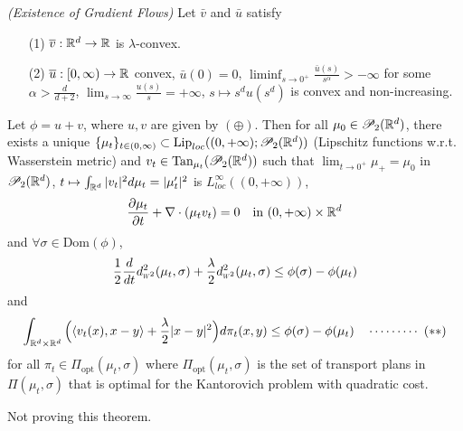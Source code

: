 \documentclass[12pt,a4paper]{article}
\newenvironment{proof}
{\begin{changemargin}{1cm}{0.5cm} 
	}%
	{\end{changemargin}
}
\begin{document}
 \emph{(Existence of Gradient Flows)} Let $\bar{v}$ and $\bar{u}$ satisfy
\begin{itemize}
\item[(1)] $\overline{v} :\mathbb{R}^d \rightarrow \mathbb{R}$ is $\lambda$-convex.
\item[(2)] $\overline{u} : [0, \infty) \rightarrow \mathbb{R}$ convex, $\bar{u}(0) =0$, $\liminf_{s\rightarrow 0^+} \frac{\bar{u}(s)}{s^{\alpha}}> -\infty$ for some $\alpha > \frac{d}{d+2}$, $\lim_{s\rightarrow \infty} \frac{u(s)}{s} = +\infty$, $s\mapsto s^d u(s^d)$ is convex and non-increasing.
\end{itemize}
Let $\phi = u+v$, where $u,v$ are given by $(\oplus)$. Then for all $\mu_0 \in \mathscr{P}_2(\mathbb{R}^d)$, there exists a unique $\{\mu_t\}_{t\in (0, \infty)} \subset \text{Lip}_{loc}((0, +\infty) ; \mathscr{P}_2(\mathbb{R}^d))$ (Lipschitz functions w.r.t. Wasserstein metric) and $v_t \in \text{Tan}_{\mu_t}(\mathscr{P}_2(\mathbb{R}^d))$ such that $\lim_{t\rightarrow 0^+} \mu_+ = \mu_0$ in $\mathscr{P}_2(\mathbb{R}^d)$, $t\mapsto \int_{\mathbb{R}^d} |v_t|^2 d\mu_t = |\mu_t'|^2$ is $L^{\infty}_{loc}((0, +\infty))$, 
\begin{align*}
\frac{\partial \mu_t}{\partial t} + \nabla \cdot (\mu_t v_t) =0 \quad \text{in }(0, +\infty) \times \mathbb{R}^d
\end{align*}
and $\forall \sigma\in \text{Dom}(\phi)$,
\begin{align*}
\frac{1}{2} \frac{d}{dt} \wa{2}^2(\mu_t, \sigma) + \frac{\lambda}{2} \wa{2}^2(\mu_t, \sigma) \leq \phi(\sigma) - \phi(\mu_t)
\end{align*}
and
\begin{align*}
\int_{\mathbb{R}^d \times \mathbb{R}^d} \Big( \langle v_t(x), x-y\rangle + \frac{\lambda}{2}|x-y|^2 \Big) d\pi_t(x,y) \leq \phi(\sigma) - \phi(\mu_t) \quad \cdots\cdots\cdots\,\,(**)
\end{align*}
for all $\pi_t \in \Pi_{\text{opt}}(\mu_t, \sigma)$ where $\Pi_{\text{opt}}(\mu_t, \sigma)$ is the set of transport plans in $\Pi(\mu_t, \sigma)$ that is optimal for the Kantorovich problem with quadratic cost.
\begin{proof}
Not proving this theorem.
\end{proof}

\s
\end{document}
